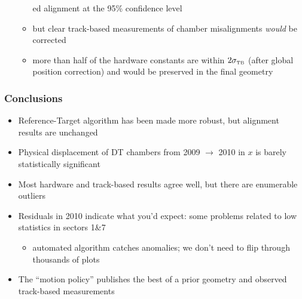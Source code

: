 \documentclass[compress]{beamer}
\begin{document}
\begin{frame}
\begin{itemize}
\begin{itemize}
ed alignment at the
  95\% confidence level

\item but clear track-based measurements of chamber misalignments
  {\it would} be corrected

\item more than half of the hardware constants are within $2
  \sigma_{\mbox{\tiny TB}}$ (after global position correction) and
  would be preserved in the final geometry
\end{itemize}
\end{itemize}
\end{frame}


\begin{frame}
\frametitle{Conclusions}

\begin{itemize}\setlength{\itemsep}{0.4 cm}
\item Reference-Target algorithm has been made more robust, but alignment results are unchanged

\item Physical displacement of DT chambers from 2009 $\to$ 2010 in $x$ is barely statistically significant

\item Most hardware and track-based results agree well, but there are enumerable outliers

\item Residuals in 2010 indicate what you'd expect: some problems related to low statistics in sectors 1\&7
\begin{itemize}
\item automated algorithm catches anomalies; we don't need to flip through thousands of plots
\end{itemize}

\item The ``motion policy'' publishes the best of a prior geometry and observed track-based measurements
\end{itemize}

\label{numpages}
\end{frame}
\end{document}
